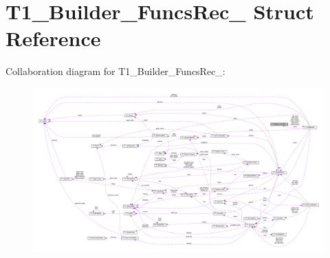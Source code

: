 \hypertarget{structT1__Builder__FuncsRec__}{}\section{T1\+\_\+\+Builder\+\_\+\+Funcs\+Rec\+\_\+ Struct Reference}
\label{structT1__Builder__FuncsRec__}


Collaboration diagram for T1\+\_\+\+Builder\+\_\+\+Funcs\+Rec\+\_\+\+:
\nopagebreak
\begin{figure}[H]
\begin{center}
\leavevmode
\includegraphics[width=350pt]{structT1__Builder__FuncsRec____coll__graph}
\end{center}
\end{figure}
